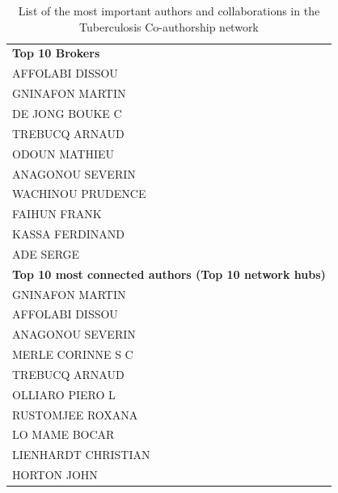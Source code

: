 \begin{table}[h!]
\caption{List of the most important authors and collaborations in the Tuberculosis Co-authorship network}
\label{table: tb_list}
\centering \small
\begin{tabular}{l}
  \toprule
\textbf{Top 10 Brokers}\\
\hspace{20pt}AFFOLABI DISSOU\\
\hspace{20pt}GNINAFON MARTIN\\
\hspace{20pt}DE JONG BOUKE C\\
\hspace{20pt}TREBUCQ ARNAUD\\
\hspace{20pt}ODOUN MATHIEU\\
\hspace{20pt}ANAGONOU SEVERIN\\
\hspace{20pt}WACHINOU PRUDENCE\\
\hspace{20pt}FAIHUN FRANK\\
\hspace{20pt}KASSA FERDINAND\\
\hspace{20pt}ADE SERGE\\
\hline
\textbf{Top 10 most connected authors (Top 10 network hubs)}\\
\hspace{20pt}GNINAFON MARTIN\\
\hspace{20pt}AFFOLABI DISSOU\\
\hspace{20pt}ANAGONOU SEVERIN\\
\hspace{20pt}MERLE CORINNE S C\\
\hspace{20pt}TREBUCQ ARNAUD\\
\hspace{20pt}OLLIARO PIERO L\\
\hspace{20pt}RUSTOMJEE ROXANA\\
\hspace{20pt}LO MAME BOCAR\\
\hspace{20pt}LIENHARDT CHRISTIAN\\
\hspace{20pt}HORTON JOHN\\

\end{tabular}
\end{table}
